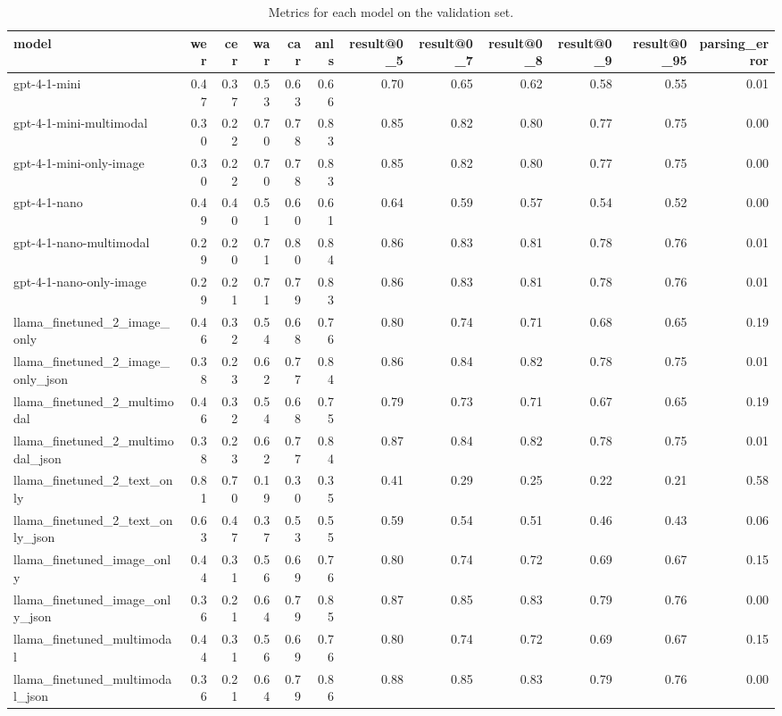 \begin{table}
\caption{Metrics for each model on the validation set.}
\label{tab:metrics}
\begin{tabular}{lrrrrrrrrrrr}
\toprule
model & wer & cer & war & car & anls & result@0_5 & result@0_7 & result@0_8 & result@0_9 & result@0_95 & parsing_error \\
\midrule
gpt-4-1-mini & 0.47 & 0.37 & 0.53 & 0.63 & 0.66 & 0.70 & 0.65 & 0.62 & 0.58 & 0.55 & 0.01 \\
gpt-4-1-mini-multimodal & 0.30 & 0.22 & 0.70 & 0.78 & 0.83 & 0.85 & 0.82 & 0.80 & 0.77 & 0.75 & 0.00 \\
gpt-4-1-mini-only-image & 0.30 & 0.22 & 0.70 & 0.78 & 0.83 & 0.85 & 0.82 & 0.80 & 0.77 & 0.75 & 0.00 \\
gpt-4-1-nano & 0.49 & 0.40 & 0.51 & 0.60 & 0.61 & 0.64 & 0.59 & 0.57 & 0.54 & 0.52 & 0.00 \\
gpt-4-1-nano-multimodal & 0.29 & 0.20 & 0.71 & 0.80 & 0.84 & 0.86 & 0.83 & 0.81 & 0.78 & 0.76 & 0.01 \\
gpt-4-1-nano-only-image & 0.29 & 0.21 & 0.71 & 0.79 & 0.83 & 0.86 & 0.83 & 0.81 & 0.78 & 0.76 & 0.01 \\
llama_finetuned_2_image_only & 0.46 & 0.32 & 0.54 & 0.68 & 0.76 & 0.80 & 0.74 & 0.71 & 0.68 & 0.65 & 0.19 \\
llama_finetuned_2_image_only_json & 0.38 & 0.23 & 0.62 & 0.77 & 0.84 & 0.86 & 0.84 & 0.82 & 0.78 & 0.75 & 0.01 \\
llama_finetuned_2_multimodal & 0.46 & 0.32 & 0.54 & 0.68 & 0.75 & 0.79 & 0.73 & 0.71 & 0.67 & 0.65 & 0.19 \\
llama_finetuned_2_multimodal_json & 0.38 & 0.23 & 0.62 & 0.77 & 0.84 & 0.87 & 0.84 & 0.82 & 0.78 & 0.75 & 0.01 \\
llama_finetuned_2_text_only & 0.81 & 0.70 & 0.19 & 0.30 & 0.35 & 0.41 & 0.29 & 0.25 & 0.22 & 0.21 & 0.58 \\
llama_finetuned_2_text_only_json & 0.63 & 0.47 & 0.37 & 0.53 & 0.55 & 0.59 & 0.54 & 0.51 & 0.46 & 0.43 & 0.06 \\
llama_finetuned_image_only & 0.44 & 0.31 & 0.56 & 0.69 & 0.76 & 0.80 & 0.74 & 0.72 & 0.69 & 0.67 & 0.15 \\
llama_finetuned_image_only_json & 0.36 & 0.21 & 0.64 & 0.79 & 0.85 & 0.87 & 0.85 & 0.83 & 0.79 & 0.76 & 0.00 \\
llama_finetuned_multimodal & 0.44 & 0.31 & 0.56 & 0.69 & 0.76 & 0.80 & 0.74 & 0.72 & 0.69 & 0.67 & 0.15 \\
llama_finetuned_multimodal_json & 0.36 & 0.21 & 0.64 & 0.79 & 0.86 & 0.88 & 0.85 & 0.83 & 0.79 & 0.76 & 0.00 \\

\end{tabular}
\end{table}
